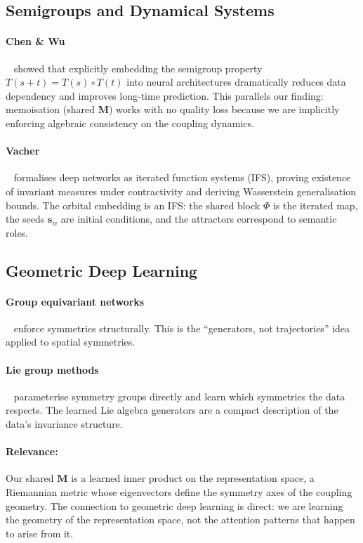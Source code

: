 \documentclass[11pt, a4paper]{article}
\newcommand{\M}{\mathbf{M}}
\newcommand{\s}{\mathbf{s}}
\theoremstyle{remark}
\begin{document}
\subsection{Semigroups and Dynamical Systems}

\paragraph{Chen \& Wu}~\cite{chen2023deeposg} showed that explicitly embedding the semigroup property $T(s+t) = T(s) \circ T(t)$ into neural architectures dramatically reduces data dependency and improves long-time prediction.
This parallels our finding: memoisation (shared $\M$) works with no quality loss because we are implicitly enforcing algebraic consistency on the coupling dynamics.

\paragraph{Vacher}~\cite{vacher2026ifs} formalises deep networks as iterated function systems (IFS), proving existence of invariant measures under contractivity and deriving Wasserstein generalisation bounds.
The orbital embedding is an IFS: the shared block $\Phi$ is the iterated map, the seeds $\s_w$ are initial conditions, and the attractors correspond to semantic roles.

\subsection{Geometric Deep Learning}

\paragraph{Group equivariant networks}~\cite{cohen2016group, bronstein2021geometric} enforce symmetries structurally.
This is the ``generators, not trajectories'' idea applied to spatial symmetries.
\paragraph{Lie group methods}~\cite{finzi2020generalizing} parameterise symmetry groups directly and learn which symmetries the data respects.
The learned Lie algebra generators are a compact description of the data's invariance structure.

\paragraph{Relevance:}
Our shared $\M$ is a learned inner product on the representation space, a Riemannian metric whose eigenvectors define the symmetry axes of the coupling geometry.
The connection to geometric deep learning is direct: we are learning the geometry of the representation space, not the attention patterns that happen to arise from it.
\end{document}
